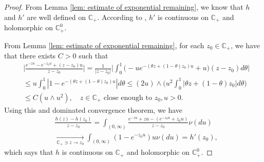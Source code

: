 \documentclass[12pt]{amsart}
\theoremstyle{plain}
\theoremstyle{definition}
\numberwithin{equation}{section}
\begin{document}
\begin{proof}
    From Lemma \ref{lem: estimate of exponential remaining}, we know that $h$ and $h'$ are well defined on $\mathbb C_+$. %
    According to \cite[Theorem 3.2. \& Theorem 3.5]{SchillingSongVondracek2010Bernstein}, $h'$ is continuous on $\mathbb C_+$ and holomorphic on $\mathbb C_+^0$.
    
    From Lemma \ref{lem: estimate of exponential remaining}, for each $z_0 \in \mathbb C_+$, we have that there exists $C>0$ such that
\begin{align}
    &\Big| \frac{e^{-zu} - e^{-z_0u}+(z-z_0) u}{z-z_0} \Big|
    = \frac{1}{|z-z_0|}\Big| \int_0^1 \big(-ue^{-(\theta z+(1-\theta)z_0)u}+u\big)(z-z_0)d\theta\Big|
    \\ &\leq u\int_0^1 |1-e^{-(\theta z +(1-\theta)z_0)u}| d\theta 
    \leq (2u) \wedge\Big( u^2\int_0^1|\theta z+(1-\theta)z_0|d\theta\Big)
    \\ &\leq C(u\wedge u^2),
    \quad z \in \mathbb C_+ \text{ close enough to } z_0, u>0.
\end{align}
    Using this and dominated convergence theorem, we have
\begin{align}
    &\frac{h(z)-h(z_0)}{z-z_0} = \int_{(0,\infty)} \frac{e^{-zu}+zu -(e^{-z_0u}+z_0u)}{z-z_0}  \nu(du) 
    \\&\xrightarrow[\mathbb C_+\ni z\to z_0]{} \int_{(0,\infty)}(1 - e^{-z_0u} )u\nu(du) = h'(z_0),
\end{align}
    which says that $h$ is continuous on $\mathbb C_+$ and holomorphic on $\mathbb C_+^0$.
\end{proof}
\end{document}
